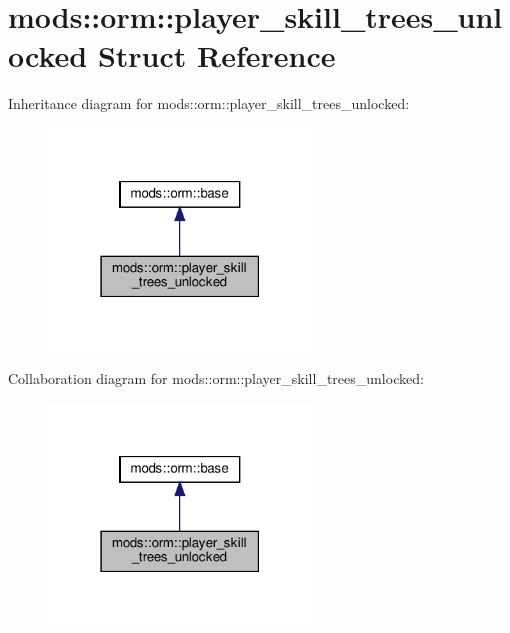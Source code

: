\hypertarget{structmods_1_1orm_1_1player__skill__trees__unlocked}{}\section{mods\+:\+:orm\+:\+:player\+\_\+skill\+\_\+trees\+\_\+unlocked Struct Reference}
\label{structmods_1_1orm_1_1player__skill__trees__unlocked}


Inheritance diagram for mods\+:\+:orm\+:\+:player\+\_\+skill\+\_\+trees\+\_\+unlocked\+:\nopagebreak
\begin{figure}[H]
\begin{center}
\leavevmode
\includegraphics[width=198pt]{structmods_1_1orm_1_1player__skill__trees__unlocked__inherit__graph}
\end{center}
\end{figure}


Collaboration diagram for mods\+:\+:orm\+:\+:player\+\_\+skill\+\_\+trees\+\_\+unlocked\+:\nopagebreak
\begin{figure}[H]
\begin{center}
\leavevmode
\includegraphics[width=198pt]{structmods_1_1orm_1_1player__skill__trees__unlocked__coll__graph}
\end{center}
\end{figure}
